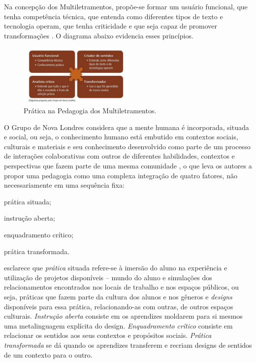 \documentclass{textolivre}
\begin{document}
Na concepção dos Multiletramentos, propõe-se formar um usuário funcional, que
tenha competência técnica, que entenda como diferentes tipos de texto e
tecnologia operam, que tenha criticidade e que seja capaz de promover
transformações \cite{rojo2012}. O diagrama abaixo evidencia esses princípios.

\begin{figure}[htbp]
 \centering
 \includegraphics[width=0.5\textwidth]{figure01.pdf}
 \caption{Prática na Pedagogia dos Multiletramentos.}
 \label{fig01}
\end{figure}

O Grupo de Nova Londres considera que a mente humana é incorporada, situada e
social, ou seja, o conhecimento humano está embutido em contextos sociais,
culturais e materiais e seu conhecimento desenvolvido como parte de um processo
de interações colaborativas com outros de diferentes habilidades, contextos e
perspectivas que fazem parte de uma mesma comunidade \cite{cope2009}, o
que leva os autores a propor uma pedagogia como uma complexa integração de
quatro fatores, não necessariamente em uma sequência fixa: 
\begin{enumerate*}[label=\alph*)]
\item prática situada;
\item instrução aberta;
\item enquadramento crítico;
\item prática transformada. 
\end{enumerate*}

\textcite{rojo2012} esclarece que \emph{prática} situada refere-se à imersão do aluno
na experiência e utilização de projetos disponíveis – mundo do aluno e
simulações dos relacionamentos encontrados nos locais de trabalho e nos espaços
públicos, ou seja, práticas que fazem parte da cultura dos alunos e nos gêneros
e \emph{designs} disponíveis para essa prática, relacionando-as com outras, de outros
espaços culturais. \emph{Instrução aberta} consiste em os aprendizes moldarem para si
mesmos uma metalinguagem explícita do design. \emph{Enquadramento crítico} consiste em
relacionar os sentidos aos seus contextos e propósitos sociais. \emph{Prática
transformada} se dá quando os aprendizes transferem e recriam designs de
sentidos de um contexto para o outro.
\end{document}
